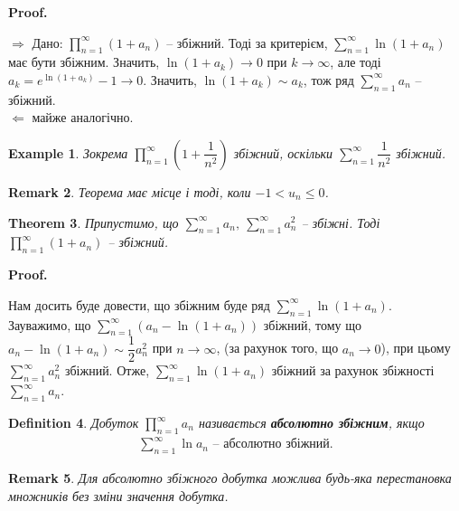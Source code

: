 \documentclass[a4paper, 10pt]{article}
\makeatletter
\def\rightproof{$\boxed{\Rightarrow}$ }
\def\leftproof{$\boxed{\Leftarrow}$ }
\theoremstyle{theoremdd}
\newtheorem{theorem}{Theorem}[subsection]
\theoremstyle{theoremdd}
\theoremstyle{theoremdd}
\newtheorem{definition}[theorem]{Definition}
\theoremstyle{theoremdd}
\theoremstyle{theoremdd}
\newtheorem{example}[theorem]{Example}
\theoremstyle{theoremdd}
\theoremstyle{theoremdd}
\newtheorem{remark}[theorem]{Remark}
\theoremstyle{theoremdd}
\theoremstyle{theoremdd}
\renewenvironment{proof}[1][Proof.\\]{\par
\pushQED{\hfill \qed}%
\normalfont \topsep6\p@\@plus6\p@\relax
\trivlist
\item\relax
{\bfseries
#1\@addpunct{.}}\hspace\labelsep\ignorespaces
}{%
\popQED\endtrivlist\@endpefalse
}
\makeatother
\begin{document}
\begin{proof}
\rightproof Дано: $\displaystyle\prod_{n=1}^\infty (1+a_n)$ -- збіжний. Тоді за критерієм, $\displaystyle\sum_{n=1}^\infty \ln(1+a_n)$ має бути збіжним. Значить, $\ln(1+a_k) \to 0$ при $k \to \infty$, але тоді $a_k = e^{\ln(1+a_k)} - 1 \to 0$. Значить, $\ln(1+a_k) \sim a_k$, тож ряд $\displaystyle\sum_{n=1}^\infty a_n$ -- збіжний.
\bigskip \\
\leftproof майже аналогічно.
\end{proof}

\begin{example}
Зокрема $\displaystyle\prod_{n=1}^\infty \left( 1 + \dfrac{1}{n^2} \right)$ збіжний, оскільки $\displaystyle\sum_{n=1}^\infty \dfrac{1}{n^2}$ збіжний.
\end{example}

\begin{remark}
Теорема має місце і тоді, коли $-1 < u_n \leq 0$.
\end{remark}

\begin{theorem}
Припустимо, що $\displaystyle\sum_{n=1}^\infty a_n,\ \sum_{n=1}^\infty a_n^2$ -- збіжні. Тоді $\displaystyle\prod_{n=1}^\infty (1+a_n)$ -- збіжний.
\end{theorem}

\begin{proof}
Нам досить буде довести, що збіжним буде ряд $\displaystyle\sum_{n=1}^\infty \ln(1+a_n)$.\\
Зауважимо, що $\displaystyle\sum_{n=1}^\infty (a_n - \ln(1+a_n))$ збіжний, тому що $a_n - \ln(1+a_n) \sim \dfrac{1}{2}a_n^2$ при $n \to \infty$, (за рахунок того, що $a_n \to 0$), при цьому $\displaystyle\sum_{n=1}^\infty a_n^2$ збіжний. Отже, $\displaystyle\sum_{n=1}^\infty \ln(1+a_n)$ збіжний за рахунок збіжності $\displaystyle\sum_{n=1}^\infty a_n$.
\end{proof}

\begin{definition}
Добуток $\displaystyle\prod_{n=1}^\infty a_n$ називається \textbf{абсолютно збіжним}, якщо
\begin{align*}
\sum_{n=1}^\infty \ln a_n \text{ -- абсолютно збіжний.}
\end{align*}
\end{definition}

\begin{remark}
Для абсолютно збіжного добутка можлива будь-яка перестановка множників без зміни значення добутка.
\end{remark}
\newpage
\end{document}
